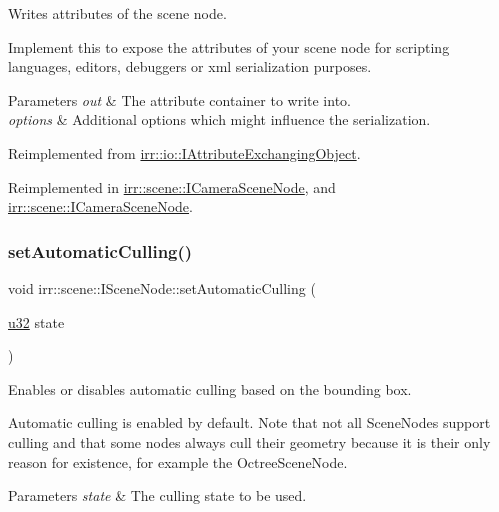 Writes attributes of the scene node. 

Implement this to expose the attributes of your scene node for scripting languages, editors, debuggers or xml serialization purposes. 
\begin{DoxyParams}{Parameters}
{\em out} & The attribute container to write into. \\
\hline
{\em options} & Additional options which might influence the serialization. \\
\hline
\end{DoxyParams}


Reimplemented from \hyperlink{classirr_1_1io_1_1IAttributeExchangingObject_a587f7b633366968f0488e1099e9172ef}{irr\+::io\+::\+I\+Attribute\+Exchanging\+Object}.



Reimplemented in \hyperlink{classirr_1_1scene_1_1ICameraSceneNode_a0a78a29638be1665ee5dba22c2c3b846}{irr\+::scene\+::\+I\+Camera\+Scene\+Node}, and \hyperlink{classirr_1_1scene_1_1ICameraSceneNode_a0a78a29638be1665ee5dba22c2c3b846}{irr\+::scene\+::\+I\+Camera\+Scene\+Node}.

\mbox{\label{classirr_1_1scene_1_1ISceneNode_a5fcd62dbf524b8d2d6daa61c7d6cf119}} 
\subsubsection{\texorpdfstring{set\+Automatic\+Culling()}{setAutomaticCulling()}\hspace{0.1cm}{\footnotesize\ttfamily [1/2]}}
{\footnotesize\ttfamily void irr\+::scene\+::\+I\+Scene\+Node\+::set\+Automatic\+Culling (\begin{DoxyParamCaption}\item[{\hyperlink{namespaceirr_a0416a53257075833e7002efd0a18e804}{u32}}]{state }\end{DoxyParamCaption})\hspace{0.3cm}{\ttfamily [inline]}}



Enables or disables automatic culling based on the bounding box. 

Automatic culling is enabled by default. Note that not all Scene\+Nodes support culling and that some nodes always cull their geometry because it is their only reason for existence, for example the Octree\+Scene\+Node. 
\begin{DoxyParams}{Parameters}
{\em state} & The culling state to be used. \\
\hline
\end{DoxyParams}
\mbox{\label{classirr_1_1scene_1_1ISceneNode_a5fcd62dbf524b8d2d6daa61c7d6cf119}} 
